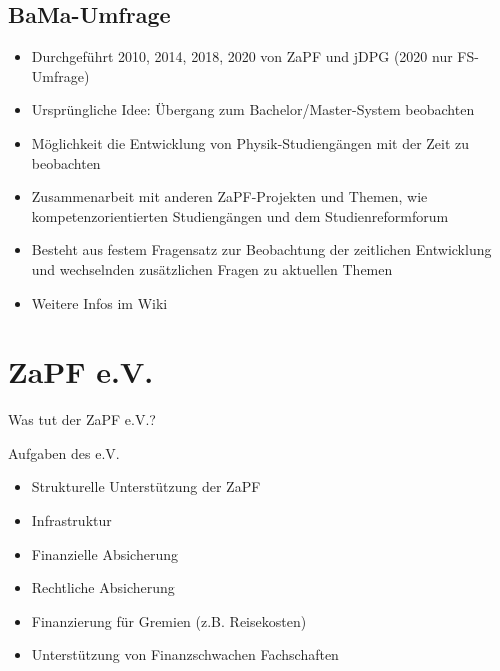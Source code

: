 \documentclass[compress, aspectratio=169]{beamer}
\begin{document}
 \subsection{BaMa-Umfrage}
 \begin{frame}{\insertsubsection}
 	\vspace*{-3mm}
 	\begin{itemize}
 		\item Durchgeführt 2010, 2014, 2018, 2020 von ZaPF und jDPG (2020 nur FS-Umfrage)
 		\item Ursprüngliche Idee: Übergang zum Bachelor/Master-System beobachten
 		\item Möglichkeit die Entwicklung von Physik-Studiengängen mit der Zeit zu beobachten
 		\pause
 		\item Zusammenarbeit mit anderen ZaPF-Projekten und Themen, wie kompetenzorientierten Studiengängen und dem Studienreformforum
 		\item Besteht aus festem Fragensatz zur Beobachtung der zeitlichen Entwicklung und wechselnden zusätzlichen Fragen zu aktuellen Themen
 		\item Weitere Infos im Wiki
 	\end{itemize}
 \end{frame}


 \section{ZaPF e.V.}

 \begin{frame}{Was tut der ZaPF e.V.?}
   \begin{block}{Aufgaben des e.V.}
     \begin{itemize}
       \item Strukturelle Unterstützung der ZaPF
       \item Infrastruktur
       \item Finanzielle Absicherung
       \item Rechtliche Absicherung
       \item Finanzierung für Gremien (z.B. Reisekosten)
       \item Unterstützung von Finanzschwachen Fachschaften
     \end{itemize}
   \end{block}
 \end{frame}
   
\end{document}
